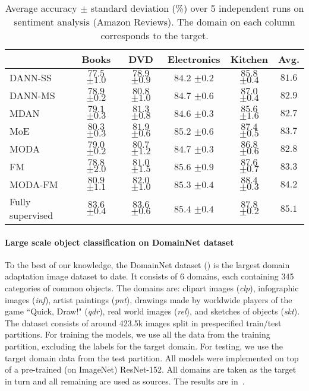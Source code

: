 \begin{table}[]
	\centering
	\begin{tabular}{l|cccc:c}
		& Books           & DVD             & Electronics     & Kitchen  & Avg. \\ \hline
		DANN-SS \cite{Ganin2015} & $ 77.5 $ \tiny{$ \pm 1.0 $} & $ 78.9 $ \tiny{$ \pm 0.9 $} & $ 84.2 $ \tiny{$ \pm 0.2 $} & $ 85.8 $ \tiny{$ \pm 0.4 $} & $81.6$ \\
		DANN-MS \cite{Ganin2015} & $ 78.9 $ \tiny{$ \pm 0.2 $} & $ 80.8 $ \tiny{$ \pm 1.0 $} & $ 84.7 $ \tiny{$ \pm 0.6 $} & $ 87.0 $ \tiny{$ \pm 0.4 $} & $82.9$ \\
		MDAN \cite{Zhao2018}     & $ 79.1 $ \tiny{$ \pm 0.3 $} & $ 81.3 $ \tiny{$ \pm 0.8 $} & $ 84.6 $ \tiny{$ \pm 0.3 $} & $ 85.6 $ \tiny{$ \pm 1.6 $} & $82.7$ \\
		MoE \cite{Guo2018}      & $ 80.3 $ \tiny{$ \pm 0.3 $} & $ 81.9 $ \tiny{$ \pm 0.6 $} & $ 85.2 $ \tiny{$ \pm 0.6 $} & $ 87.4 $ \tiny{$ \pm 0.5 $} & $83.7$\\ \hline
		MODA     & $ 79.0 $ \tiny{$ \pm 0.2 $} & $ 80.7 $ \tiny{$ \pm 1.2 $} & $ 84.7 $ \tiny{$ \pm 0.3 $} & $ 86.8 $ \tiny{$ \pm 0.6 $} & $82.8$\\
		FM         & $ 78.8 $ \tiny{$ \pm 2.0 $} & $ 81.0 $ \tiny{$ \pm 1.5 $} & $\boldsymbol{85.6}$ \tiny{$\pm 0.9 $} & $ 87.6 $ \tiny{$ \pm 0.7 $} & $83.3$\\
		MODA-FM    & $\boldsymbol{80.9}$ \tiny{$\pm 1.1$} & $\boldsymbol{82.0}$ \tiny{$\pm 1.0$} & $ 85.3 $ \tiny{$ \pm 0.4 $} & $\boldsymbol{88.4}$ \tiny{$\pm 0.3$} & $\boldsymbol{84.2}$\\ \hline
		Fully supervised & $ 83.6 $ \tiny{$ \pm 0.4 $} & $ 83.6 $ \tiny{$ \pm 0.6 $} & $ 85.4 $ \tiny{$ \pm 0.4 $} & $ 87.8 $ \tiny{$ \pm 0.2 $} & $85.1$
	\end{tabular}
	\caption{Average accuracy $\pm$ standard deviation (\%) over 5 independent runs on sentiment analysis (Amazon Reviews). The domain on each column corresponds to the target.}
	\label{tab:amazon_acc}
\end{table}

\paragraph{Large scale object classification on DomainNet dataset} To the best of our knowledge, the DomainNet dataset (\citet{Peng2019}) is the largest domain adaptation image dataset to date. It consists of 6 domains, each containing 345 categories of common objects. The domains are: clipart images (\textit{clp}), infographic images (\textit{inf}), artist paintings (\textit{pnt}), drawings made by worldwide players of the game ``Quick, Draw!" (\textit{qdr}), real world images (\textit{rel}), and sketches of objects (\textit{skt}). The dataset consists of around 423.5k images split in prespecified train/test partitions. For training the models, we use all the data from the training partition, excluding the labels for the target domain. For testing, we use the target domain data from the test partition. All models were implemented on top of a pre-trained (on ImageNet) ResNet-152. All domains are taken as the target in turn and all remaining are used as sources. The results are in~.

